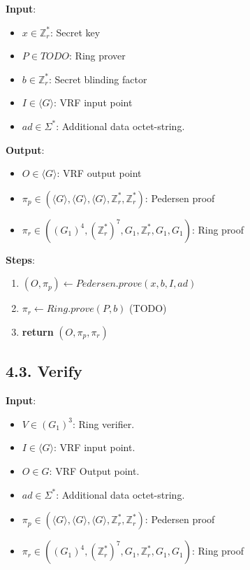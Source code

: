 \documentclass[
]{article}
\providecommand{\tightlist}{%
  \setlength{\itemsep}{0pt}\setlength{\parskip}{0pt}}
\begin{document}
\textbf{Input}:

\begin{itemize}
\tightlist
\item
  \(x \in \mathbb{Z}^*_r\): Secret key
\item
  \(P \in TODO\): Ring prover
\item
  \(b \in \mathbb{Z}^*_r\): Secret blinding factor
\item
  \(I \in \langle G \rangle\): VRF input point
\item
  \(ad \in \Sigma^*\): Additional data octet-string.
\end{itemize}

\textbf{Output}:

\begin{itemize}
\tightlist
\item
  \(O \in \langle G \rangle\): VRF output point
\item
  \(\pi_p \in (\langle G \rangle, \langle G \rangle, \langle G \rangle, \mathbb{Z}^*_r, \mathbb{Z}^*_r)\):
  Pedersen proof
\item
  \(\pi_r \in ((G_1)^4, (\mathbb{Z}^*_r)^7, G_1, \mathbb{Z}^*_r, G_1, G_1)\):
  Ring proof
\end{itemize}

\textbf{Steps}:

\begin{enumerate}
\def\labelenumi{\arabic{enumi}.}
\tightlist
\item
  \((O, \pi_p) \leftarrow Pedersen.prove(x, b, I, ad)\)
\item
  \(\pi_r \leftarrow Ring.prove(P, b)\) (TODO)
\item
  \textbf{return} \((O, \pi_p, \pi_r)\)
\end{enumerate}

\hypertarget{verify-2}{%
\subsection{4.3. Verify}\label{verify-2}}

\textbf{Input}:

\begin{itemize}
\tightlist
\item
  \(V \in (G_1)^3\): Ring verifier.
\item
  \(I \in \langle G \rangle\): VRF input point.
\item
  \(O \in G\): VRF Output point.
\item
  \(ad \in \Sigma^*\): Additional data octet-string.
\item
  \(\pi_p \in (\langle G \rangle, \langle G \rangle, \langle G \rangle, \mathbb{Z}^*_r, \mathbb{Z}^*_r)\):
  Pedersen proof
\item
  \(\pi_r \in ((G_1)^4, (\mathbb{Z}^*_r)^7, G_1, \mathbb{Z}^*_r, G_1, G_1)\):
  Ring proof
\end{itemize}
\end{document}
